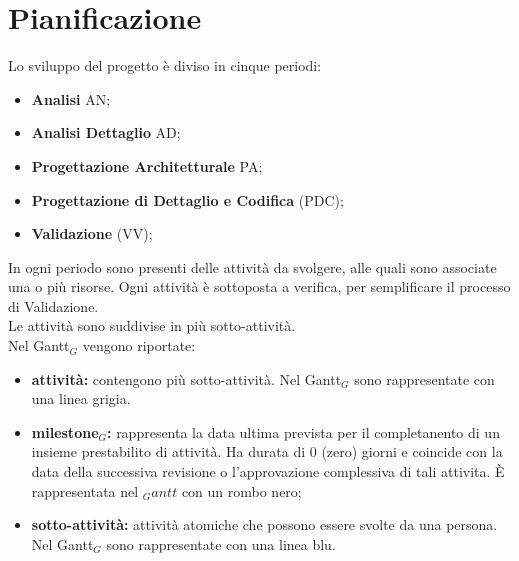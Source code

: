 \chapter{Pianificazione}
Lo sviluppo del progetto è diviso in cinque periodi:
\begin{itemize}
    \item \textbf{Analisi} AN;
    \item \textbf{Analisi Dettaglio} AD;
    \item \textbf{Progettazione Architetturale} PA;
    \item \textbf{Progettazione di Dettaglio e Codifica} (PDC);
    \item \textbf{Validazione} (VV);
\end{itemize}
In ogni periodo sono presenti delle attività da svolgere, alle quali sono associate una o più risorse. Ogni attività è sottoposta a verifica, per semplificare il processo di Validazione.\\
Le attività sono suddivise in più sotto-attività.\\
Nel Gantt$_{G}$ vengono riportate:
\begin{itemize}
    \item \textbf{attività:} contengono più sotto-attività. Nel Gantt$_{G}$ sono rappresentate con una linea grigia.
    \item \textbf{milestone$_{G}$:} rappresenta la data ultima prevista per il completanento di un insieme prestabilito di attività. Ha durata di 0 (zero) giorni e coincide con la data della successiva revisione o l'approvazione complessiva di tali attivita. È rappresentata nel $_Gantt$ con un rombo nero;
    \item \textbf{sotto-attività:} attività atomiche che possono essere svolte da una persona. Nel Gantt$_{G}$ sono rappresentate con una linea blu.  
\end{itemize}
